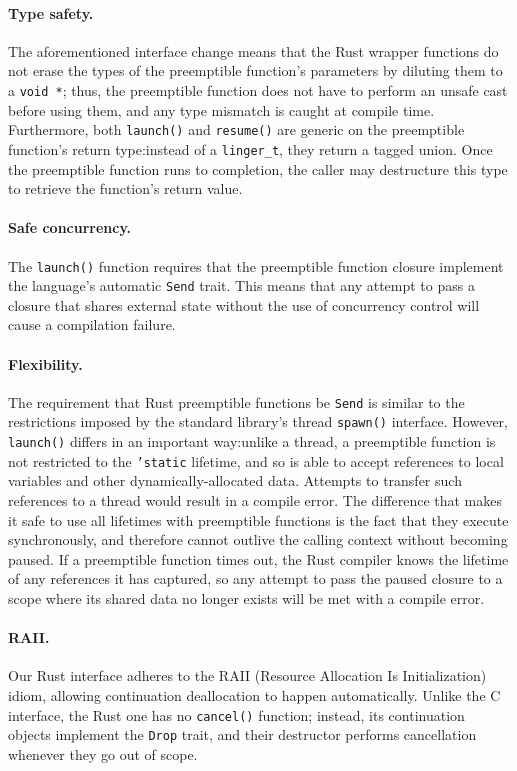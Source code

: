 \paragraph{Type safety.}
The aforementioned interface change means that the Rust wrapper functions do not
erase the types of the preemptible function's parameters by diluting them to a
\texttt{void *}; thus, the preemptible function does not have to perform an unsafe
cast before using them, and any type mismatch is caught at compile time.
Furthermore, both \texttt{launch()} and \texttt{resume()} are generic on the
preemptible function's return type:\@ instead of a \texttt{linger\_t}, they return a
tagged union.  Once the preemptible function runs to completion, the caller may
destructure this type to retrieve the function's return value.


\paragraph{Safe concurrency.}
The \texttt{launch()} function requires that the preemptible function closure
implement the language's automatic \texttt{Send} trait.  This means that any attempt
to pass a closure that shares external state without the use of concurrency control
will cause a compilation failure.


\paragraph{Flexibility.}
The requirement that Rust preemptible functions be \texttt{Send} is similar to the
restrictions imposed by the standard library's thread \texttt{spawn()} interface.
However, \texttt{launch()} differs in an important way:\@ unlike a thread, a
preemptible function is not restricted to the \texttt{'static} lifetime, and so is
able to accept references to local variables and other dynamically-allocated data.
Attempts to transfer such references to a thread would result in a compile error.
The difference that makes it safe to use all lifetimes with preemptible functions is
the fact that they execute synchronously, and therefore cannot outlive the calling
context without becoming paused.  If a preemptible function times out, the Rust
compiler knows the lifetime of any references it has captured, so any attempt to pass
the paused closure to a scope where its shared data no longer exists will be met with
a compile error.


\paragraph{RAII.}
Our Rust interface adheres to the RAII (Resource Allocation Is Initialization) idiom,
allowing continuation deallocation to happen automatically.  Unlike the C interface,
the Rust one has no \texttt{cancel()} function; instead, its continuation objects
implement the \texttt{Drop} trait, and their destructor performs cancellation
whenever they go out of scope.
\\


